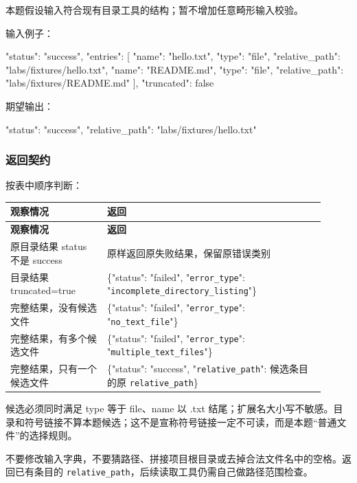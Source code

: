 本题假设输入符合现有目录工具的结构；暂不增加任意畸形输入校验。

输入例子：

\begin{Code}
{
  "status": "success",
  "entries": [
    {"name": "hello.txt", "type": "file", "relative_path": "labs/fixtures/hello.txt"},
    {"name": "README.md", "type": "file", "relative_path": "labs/fixtures/README.md"}
  ],
  "truncated": false
}
\end{Code}

期望输出：

\begin{Code}
{"status": "success", "relative_path": "labs/fixtures/hello.txt"}
\end{Code}

\subsubsection{返回契约}

按表中顺序判断：

{\small\setlength{\tabcolsep}{4pt}
\renewcommand{\arraystretch}{1.25}
\begin{longtable}{>{\raggedright\arraybackslash}p{0.28\linewidth}>{\raggedright\arraybackslash}p{0.63\linewidth}}
\toprule
\textbf{观察情况} & \textbf{返回} \\
\midrule\endfirsthead
\toprule
\textbf{观察情况} & \textbf{返回} \\
\midrule\endhead
\bottomrule\endfoot
原目录结果 status 不是 success & 原样返回原失败结果，保留原错误类别 \\
目录结果 truncated=true & \{"status": "failed", "\nolinkurl{error_type}": "\nolinkurl{incomplete_directory_listing}"\} \\
完整结果，没有候选文件 & \{"status": "failed", "\nolinkurl{error_type}": "\nolinkurl{no_text_file}"\} \\
完整结果，有多个候选文件 & \{"status": "failed", "\nolinkurl{error_type}": "\nolinkurl{multiple_text_files}"\} \\
完整结果，只有一个候选文件 & \{"status": "success", "\nolinkurl{relative_path}": 候选条目的原 \nolinkurl{relative_path}\} \\
\end{longtable}}

候选必须同时满足 type 等于 file、name 以 .txt 结尾；扩展名大小写不敏感。目录和符号链接不算本题候选；这不是宣称符号链接一定不可读，而是本题“普通文件”的选择规则。

不要修改输入字典，不要猜路径、拼接项目根目录或去掉合法文件名中的空格。返回已有条目的 \nolinkurl{relative_path}，后续读取工具仍需自己做路径范围检查。

